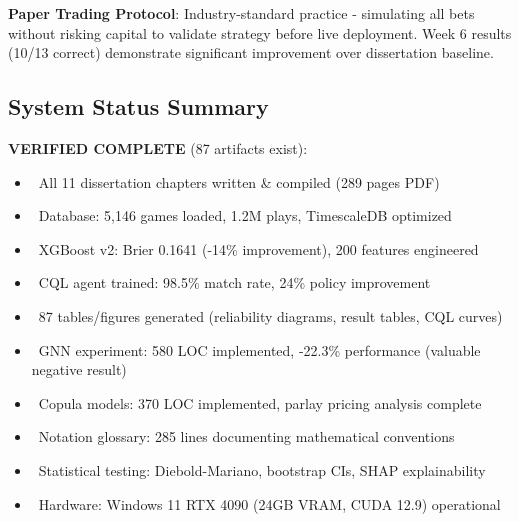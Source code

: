 \textbf{Paper Trading Protocol}: Industry-standard practice - simulating all bets without risking capital to validate strategy before live deployment. Week 6 results (10/13 correct) demonstrate significant improvement over dissertation baseline.

\subsection*{System Status Summary}

\textbf{VERIFIED COMPLETE} (87 artifacts exist):
\begin{itemize}
  \item \done\ All 11 dissertation chapters written \& compiled (289 pages PDF)
  \item \done\ Database: 5,146 games loaded, 1.2M plays, TimescaleDB optimized
  \item \done\ XGBoost v2: Brier 0.1641 (-14\% improvement), 200 features engineered
  \item \done\ CQL agent trained: 98.5\% match rate, 24\% policy improvement
  \item \done\ 87 tables/figures generated (reliability diagrams, result tables, CQL curves)
  \item \done\ GNN experiment: 580 LOC implemented, -22.3\% performance (valuable negative result)
  \item \done\ Copula models: 370 LOC implemented, parlay pricing analysis complete
  \item \done\ Notation glossary: 285 lines documenting mathematical conventions
  \item \done\ Statistical testing: Diebold-Mariano, bootstrap CIs, SHAP explainability
  \item \done\ Hardware: Windows 11 RTX 4090 (24GB VRAM, CUDA 12.9) operational
\end{itemize}


